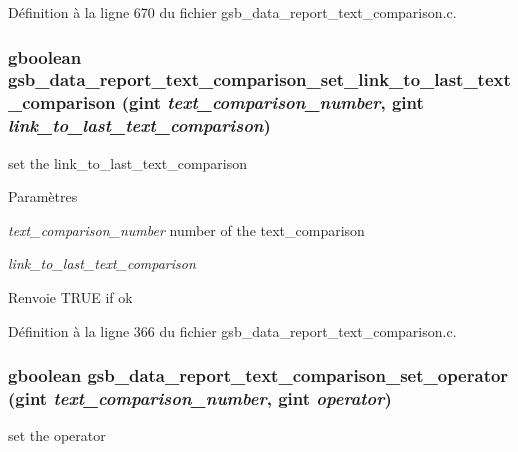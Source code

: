 Définition à la ligne 670 du fichier gsb\_\-data\_\-report\_\-text\_\-comparison.c.

\subsubsection[{gsb\_\-data\_\-report\_\-text\_\-comparison\_\-set\_\-link\_\-to\_\-last\_\-text\_\-comparison}]{\setlength{\rightskip}{0pt plus 5cm}gboolean gsb\_\-data\_\-report\_\-text\_\-comparison\_\-set\_\-link\_\-to\_\-last\_\-text\_\-comparison (gint {\em text\_\-comparison\_\-number}, \/  gint {\em link\_\-to\_\-last\_\-text\_\-comparison})}\label{gsb__data__report__text__comparison_8h_a567c2e8fee6656c84711b5c841837ac3}
set the link\_\-to\_\-last\_\-text\_\-comparison


\begin{DoxyParams}{Paramètres}
\item[{\em text\_\-comparison\_\-number}]number of the text\_\-comparison \item[{\em link\_\-to\_\-last\_\-text\_\-comparison}]\end{DoxyParams}
\begin{DoxyReturn}{Renvoie}
TRUE if ok 
\end{DoxyReturn}


Définition à la ligne 366 du fichier gsb\_\-data\_\-report\_\-text\_\-comparison.c.

\subsubsection[{gsb\_\-data\_\-report\_\-text\_\-comparison\_\-set\_\-operator}]{\setlength{\rightskip}{0pt plus 5cm}gboolean gsb\_\-data\_\-report\_\-text\_\-comparison\_\-set\_\-operator (gint {\em text\_\-comparison\_\-number}, \/  gint {\em operator})}\label{gsb__data__report__text__comparison_8h_ab02defea7727c6cec1d81d31bf64ebde}
set the operator


